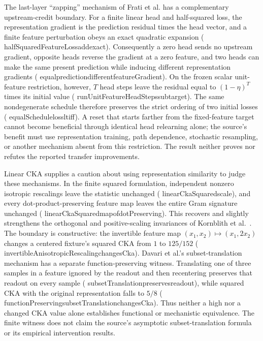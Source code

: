 \documentclass[11pt]{article}
\newcommand{\leanname}[1]{{\scriptsize\ttfamily
  \def\_{\textunderscore\allowbreak}#1}}
\begin{document}
The last-layer ``zapping'' mechanism of Frati et al.
\cite{frati2024reset} has a complementary upstream-credit boundary.  For a
finite linear head and half-squared loss, the representation gradient is the
prediction residual times the head vector, and a finite feature perturbation
obeys an exact quadratic expansion
(\leanname{halfSquaredFeatureLoss\_add\_exact}).  Consequently a zero head
sends no upstream gradient, opposite heads reverse the gradient at a zero
feature, and two heads can make the same present prediction while inducing
different representation gradients
(\leanname{equal\_prediction\_different\_featureGradient}).
On the frozen scalar unit-feature restriction, however, $T$ head steps leave
the residual equal to $(1-\eta)^T$ times its initial value
(\leanname{runUnitFeatureHeadSteps\_sub\_target}).  The same nondegenerate
schedule therefore preserves the strict ordering of two initial losses
(\leanname{equalSchedule\_loss\_lt\_iff}).  A reset that starts farther from
the fixed-feature target cannot become beneficial through identical head
relearning alone; the source's benefit must use representation training,
path dependence, stochastic resampling, or another mechanism absent from this
restriction.  The result neither proves nor refutes the reported transfer
improvements.

Linear CKA supplies a caution about using representation similarity to judge
these mechanisms.  In the finite squared formulation, independent nonzero
isotropic rescalings leave the statistic unchanged
(\leanname{linearCkaSquared\_scale}), and every dot-product-preserving feature
map leaves the entire Gram signature unchanged
(\leanname{linearCkaSquared\_map\_of\_dotPreserving}).  This recovers and
slightly strengthens the orthogonal and positive-scaling invariances of
Kornblith et al.~\cite{kornblith2019cka}.  The boundary is constructive:
the invertible feature map $(x_1,x_2)\mapsto(x_1,2x_2)$ changes a centered
fixture's squared CKA from $1$ to $125/152$
(\leanname{invertibleAnisotropicRescaling\_changesCka}).
Davari et al.'s subset-translation mechanism
\cite{davari2022cka} has a separate function-preserving witness.  Translating
one of three samples in a feature ignored by the readout and then recentering
preserves that readout on every sample
(\leanname{subsetTranslation\_preserves\_readout}), while squared CKA with the
original representation falls to $5/8$
(\leanname{functionPreserving\_subsetTranslation\_changesCka}).
Thus neither a high nor a changed CKA value alone establishes functional or
mechanistic equivalence.  The finite witness does not claim the source's
asymptotic subset-translation formula or its empirical intervention results.
\end{document}
